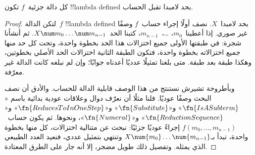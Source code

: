 \documentclass[../../../include/open-logic-section]{subfiles}
\begin{document}

\begin{thm}
كل دالة جزئية~$f$ تكون !!{lambda defined} بحد لامبدا تقبل الحساب.
\end{thm}

\begin{proof}
لتكن الدالة~$f$ !!{lambda defined} بحد لامبدا~$X$.
نصف أولًا إجراء حساب~$f$ وصفًا غير صوري.
إذا أعطينا~$m_0$، \dots،~$m_{n-1}$،
كتبنا الحد~$X \num m_0 \ldots \num m_{n-1}$.
ثم أنشأنا شجرة: في طبقتها الأولى جميع اختزالات هذا الحد
بخطوة واحدة، وتحت كل حد منها جميع اختزالاته بخطوة واحدة،
فتكون الطبقة الثانية اختزالات الحد الأصلي بخطوتين،
وهكذا طبقة بعد طبقة. متى بلغنا تمثيلًا عدديًا أعدناه جوابًا؛
وإن لم نبلغه كانت الدالة غير معرّفة.

وبأطروحة تشيرش نستنتج من هذا الوصف قابلية الدالة للحساب.
والأدق أن نصف البحث وصفًا عوديًا. فلنا مثلًا أن نعرّف دوال
وعلاقات عودية بدائية باسم
«$\fn{IsASubterm}$» و«$\fn{Substitute}$»
و«$\fn{ReducesToInOneStep}$» و«$\fn{ReductionSequence}$»
و«$\fn{Numeral}$»، ونحوها.
ثم يكون حساب~$f(m_0, \dots, m_{n-1})$ إجراءً عوديًا جزئيًا:
نبحث عن متتالية اختزالات، كل منها بخطوة واحدة، تبدأ
بـ$X \num{m_0} \dots \num{m_{n-1}}$ وتنتهي بتمثيل عددي،
فنعيد العدد الطبيعي الذي يمثله.
وتفصيل ذلك طويل مضجر، إلا أنه جار على الطرق المعتادة.
\end{proof}
\end{document}
